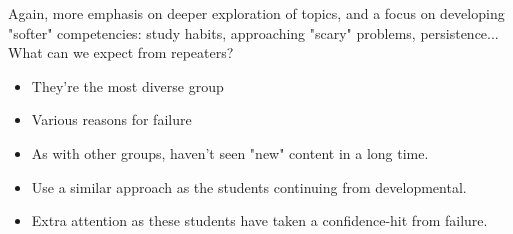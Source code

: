 \documentclass{ximera}
\begin{document}
Again, more emphasis on deeper exploration of topics, and a focus on developing
"softer" competencies: study habits, approaching "scary" problems, persistence...\\


What can we expect from repeaters?\\
\begin{itemize}
\item They're the most diverse group
\item Various reasons for failure
\item As with other groups, haven't seen "new" content in a long time.
\item Use a similar approach as the students continuing from developmental.
\item Extra attention as these students have taken a confidence-hit from failure.
\end{itemize}
\end{document}
